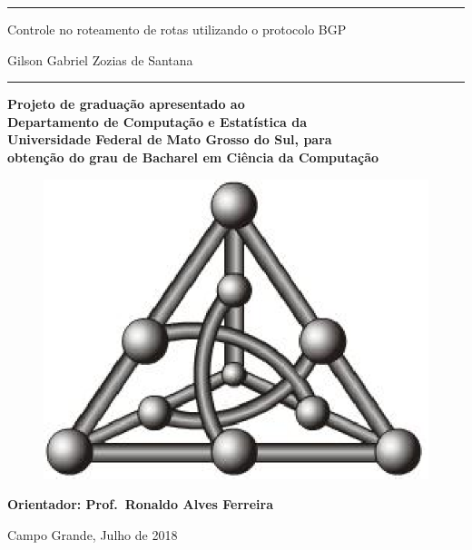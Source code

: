 \documentclass[12pt,a4paper]{report}
\begin{document}

\begin{center}
\noindent \rule{\linewidth}{.1cm}

\vspace*{1cm}

{\LARGE \textsf{Controle no roteamento de rotas utilizando o protocolo BGP}}

\vspace*{1cm}

{\Large \textsf{Gilson Gabriel Zozias de Santana}}

\vspace*{1cm}

\noindent \rule{\linewidth}{.1cm}

\vspace*{1cm}

{\large

\textbf{Projeto de gradua\c{c}\~{a}o apresentado ao} \\
\textbf{Departamento de Computa\c{c}\~{a}o e Estat\'{i}stica da} \\
\textbf{Universidade Federal de Mato Grosso do Sul, para} \\
\textbf{obten\c{c}\~{a}o do grau de Bacharel em Ci\^encia da Computa\c{c}\~ao}

}

\vspace*{1cm}

\begin{figure}[htb]
  \begin{center}
    \includegraphics{Imagens/grafo}
  \end{center}
\end{figure}
\vspace{2 cm}

\textbf{Orientador: Prof.~Ronaldo Alves Ferreira}


Campo Grande, Julho de 2018

\end{center}
\end{document}
